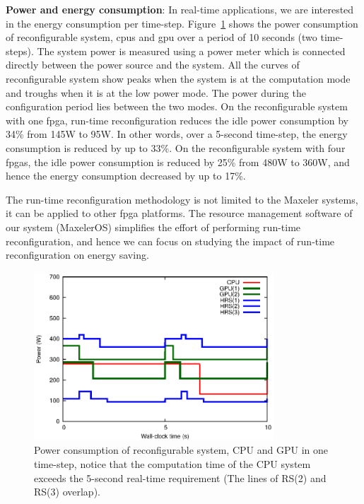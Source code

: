 \textbf{Power and energy consumption}: In real-time applications, we are interested in the energy consumption per time-step.
Figure~\ref{fig:power} shows the power consumption of reconfigurable system, \glspl{cpu} and \gls{gpu} over a period of 10 seconds (two time-steps).
The system power is measured using a power meter which is connected directly between the power source and the system.
All the curves of reconfigurable system show peaks when the system is at the computation mode and troughs when it is at the low power mode.
The power during the configuration period lies between the two modes.
On the reconfigurable system with one \gls{fpga}, run-time reconfiguration reduces the idle power consumption by 34\% from 145W to 95W.
In other words, over a 5-second time-step, the energy consumption is reduced by up to 33\%.
On the reconfigurable system with four \glspl{fpga}, the idle power consumption is reduced by 25\% from 480W to 360W, and hence the energy consumption decreased by up to 17\%.

The run-time reconfiguration methodology is not limited to the Maxeler systems, it can be applied to other \gls{fpga} platforms.
The resource management software of our system (MaxelerOS) simplifies the effort of performing run-time reconfiguration, and hence we can focus on studying the impact of run-time reconfiguration on energy saving.

\begin{figure}[t!]
\centering
\includegraphics[width=0.8\textwidth]{4_adaptation/figures/fig_power2}
\caption[Power consumption of reconfigurable system (RS), CPU and GPU in one time-step, notice that the computation time of the CPU system exceeds the 5-second real-time requirement]{Power consumption of reconfigurable system, CPU and GPU in one time-step, notice that the computation time of the CPU system exceeds the 5-second real-time requirement (The lines of RS(2) and RS(3) overlap).}
\label{fig:power}
\end{figure}


